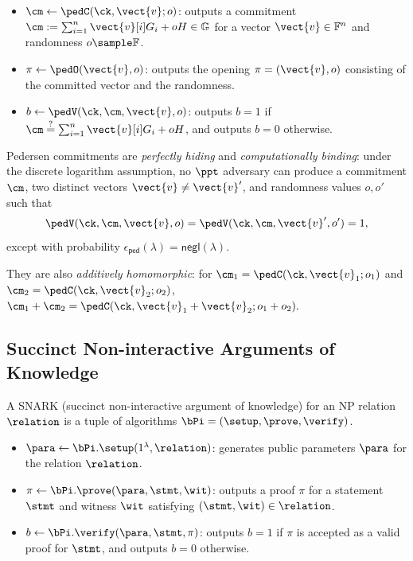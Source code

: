 \begin{itemize}
\item $\cm \gets \pedC(\ck,\vect{v};o)$:
outputs a commitment $\cm := \sum_{i=1}^{n}\vect{v}[i]G_i + oH \in \mathbb{G}$ for a vector $\vect{v}\in\mathbb{F}^n$ and randomness $o\sample\mathbb{F}$.

\item $\pi \gets \pedO(\vect{v},o)$:
outputs the opening $\pi=(\vect{v},o)$ consisting of the committed vector and the randomness.

\item $b \gets \pedV(\ck,\cm,\vect{v},o)$:
outputs $b=1$ if $\cm \stackrel{?}{=} \sum_{i=1}^{n}\vect{v}[i]G_i + oH$,
and outputs $b=0$ otherwise.
\end{itemize}

Pedersen commitments are \emph{perfectly hiding} and
\emph{computationally binding}: under the discrete logarithm assumption,
no $\ppt$ adversary can produce a commitment $\cm$, two distinct vectors
$\vect{v}\neq\vect{v}'$, and randomness values $o,o'$ such that
\[
\pedV(\ck,\cm,\vect{v},o) = \pedV(\ck,\cm,\vect{v}',o') = 1,
\]
except with probability
$\epsilon_{\mathsf{ped}}(\lambda)=\mathsf{negl}(\lambda)$.

They are also \emph{additively homomorphic}: for
$\cm_1=\pedC(\ck,\vect{v}_1;o_1)$ and
$\cm_2=\pedC(\ck,\vect{v}_2;o_2)$, $\cm_1+\cm_2 = \pedC(\ck,\vect{v}_1+\vect{v}_2;o_1+o_2).$


\subsection{Succinct Non-interactive Arguments of Knowledge}
\label{sec:prelim-snark}

A SNARK (succinct non-interactive argument of knowledge) for an NP relation
$\relation$ is a tuple of algorithms $\bPi=(\setup,\prove,\verify)$.

\begin{itemize}
\item $\para \gets \bPi.\setup(1^\lambda,\relation)$:
generates public parameters $\para$ for the relation $\relation$.

\item $\pi \gets \bPi.\prove(\para,\stmt,\wit)$:
outputs a proof $\pi$ for a statement $\stmt$ and witness $\wit$ satisfying $(\stmt,\wit)\in\relation$.

\item $b \gets \bPi.\verify(\para,\stmt,\pi)$:
outputs $b=1$ if $\pi$ is accepted as a valid proof for $\stmt$, and outputs $b=0$ otherwise.
\end{itemize}

